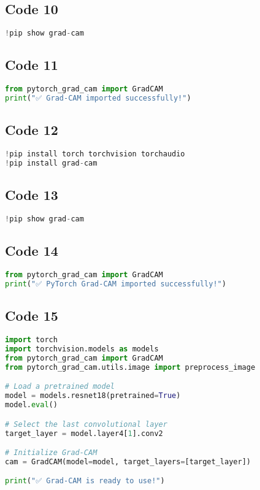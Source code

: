 \documentclass{article}
\begin{document}
\subsection*{Code 10}
\begin{lstlisting}[language=Python]
!pip show grad-cam

\end{lstlisting}

\subsection*{Code 11}
\begin{lstlisting}[language=Python]
from pytorch_grad_cam import GradCAM
print("✅ Grad-CAM imported successfully!")

\end{lstlisting}

\subsection*{Code 12}
\begin{lstlisting}[language=Python]
!pip install torch torchvision torchaudio
!pip install grad-cam

\end{lstlisting}

\subsection*{Code 13}
\begin{lstlisting}[language=Python]
!pip show grad-cam

\end{lstlisting}

\subsection*{Code 14}
\begin{lstlisting}[language=Python]
from pytorch_grad_cam import GradCAM
print("✅ PyTorch Grad-CAM imported successfully!")

\end{lstlisting}

\subsection*{Code 15}
\begin{lstlisting}[language=Python]
import torch
import torchvision.models as models
from pytorch_grad_cam import GradCAM
from pytorch_grad_cam.utils.image import preprocess_image

# Load a pretrained model
model = models.resnet18(pretrained=True)
model.eval()

# Select the last convolutional layer
target_layer = model.layer4[1].conv2

# Initialize Grad-CAM
cam = GradCAM(model=model, target_layers=[target_layer])

print("✅ Grad-CAM is ready to use!")

\end{lstlisting}
\end{document}
